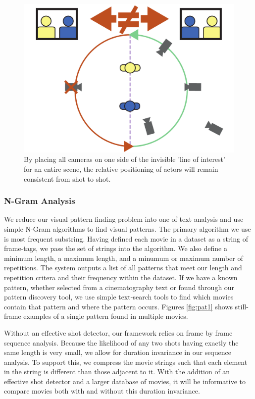 \begin{figure}
\begin{center}
\includegraphics[width=0.98\linewidth]
    {fig/lineOfAction.pdf}
\end{center}
\caption{By placing all cameras on one side of the invisible 'line of interest' for an entire scene, the relative positioning of actors will remain consistent from shot to shot.}
\label{fig:lineOfInterest}
\end{figure}

\subsubsection{N-Gram Analysis}
We reduce our visual pattern finding problem into one of text analysis and use simple N-Gram algorithms to find visual patterns. The primary algorithm we use is most frequent substring. Having defined each movie in a dataset as a string of frame-tags, we pass the set of strings into the algorithm. We also define a minimum length, a maximum length, and a minumum or maximum number of repetitions. The system outputs a list of all patterns that meet our length and repetition critera and their frequency within the dataset. If we have a known pattern, whether selected from a cinematography text or found through our pattern discovery tool, we use simple text-search tools to find which movies contain that pattern and where the pattern occurs. Figures \ref{fig:pat1} shows still-frame examples of a single pattern found in multiple movies.

Without an effective shot detector, our framework relies on frame by frame sequence analysis. Because the likelihood of any two shots having exactly the same length is very small, we allow for duration invariance in our sequence analysis. To support this, we compress the movie strings such that each element in the string is different than those adjacent to it. With the addition of an effective shot detector and a larger database of movies, it will be informative to compare movies both with and without this duration invariance.



